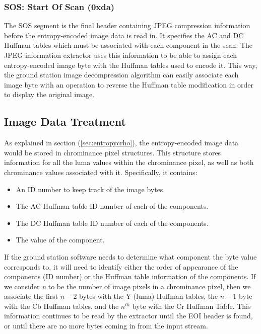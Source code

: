 \subsubsection{SOS: Start Of Scan (0xda)}

The SOS segment is the final header containing JPEG
compression information before the entropy-encoded
image data is read in. It specifies the AC and DC Huffman tables
which must be associated with each component in the scan.
The JPEG information extractor uses this information to be
able to assign each entropy-encoded image byte with
the Huffman tables used to encode it. This way, the 
ground station image decompression algorithm can 
easily associate each image byte with an operation to
reverse the Huffman table modification in order to display
the original image.

\subsection{Image Data Treatment}

As explained in section (\ref{sec:entropycrho}), the entropy-encoded
image data would be stored in chrominance pixel structures. This structure
stores information for all the luma values within the chrominance pixel, 
as well as both chrominance values associated with it. Specifically, it contains:
\begin{itemize}
	\item An ID number to keep track of the image bytes.
	\item The AC Huffman table ID number of each of the components.
	\item The DC Huffman table ID number of each of the components.
	\item The value of the component.
\end{itemize}
If the ground station software needs to determine what 
component the byte value corresponds to, it will need to identify either 
the order of appearance of the components (ID number) or the 
Huffman table information of the components.
If we consider \emph{n} to be the number of image pixels in a chrominance pixel, then 
we associate the first $n - 2$ bytes with the Y (luma) Huffman tables, the $n - 1$ byte with the Cb Huffman tables, and 
the $n^{th}$ byte with the Cr Huffman Table. 
This information continues to be read by the extractor 
until the EOI header is found, or until there are no more bytes coming in from the input stream.


